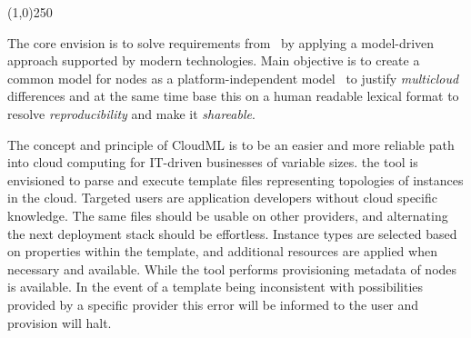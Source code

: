 \begin{center}
\line(1,0){250}
\end{center}

The core envision is to solve requirements from~ by applying a 
model-driven approach supported by modern technologies.
Main objective is to create a common model for nodes as a platform-independent 
model~\cite{agile:cuong10}
to justify \emph{multicloud} differences and 
at the same time base this on a human readable lexical format to resolve \emph{reproducibility} and
make it \emph{shareable}.

The concept and principle of CloudML is to be an easier and more reliable
path into cloud computing for IT-driven businesses of variable sizes.
the tool is envisioned to parse and execute template files representing topologies
of instances in the cloud. Targeted users are application developers without
cloud specific knowledge. The same files should be usable on other providers,
and alternating the next deployment stack should be effortless.
Instance types are selected based on properties within the template,
and additional resources are applied when necessary and available.
While the tool performs provisioning metadata of nodes is available.
In the event of a template being inconsistent with possibilities 
provided by a specific provider this error will be informed 
to the user and provision will halt.

